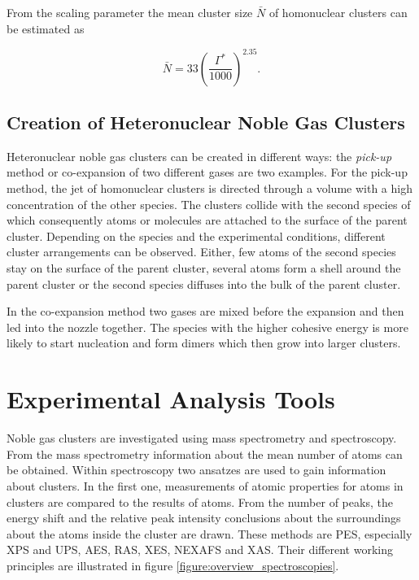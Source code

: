 From the scaling parameter the mean cluster size $\bar{N}$ 
of homonuclear clusters can be
estimated as

\begin{equation}
  \bar{N} = 33 \left( \frac{\Gamma^*}{1000} \right) ^{2.35} .
\end{equation}


\subsection{Creation of Heteronuclear Noble Gas Clusters}
Heteronuclear noble gas clusters can be created in different ways:
the \emph{pick-up} method or co-expansion of two different gases are two examples.
For the pick-up method, the jet of homonuclear clusters is directed through
a volume with a high concentration of the other species. The clusters
collide with the second species of which consequently atoms or molecules
are attached to the surface
of the parent cluster. Depending on the species
and the experimental conditions, different cluster arrangements can be observed.
Either, few atoms
of the second species stay on the surface of the parent cluster,
several atoms form a shell around the parent cluster or the second species
diffuses into the bulk of the parent cluster.

In the co-expansion method two gases are mixed before the expansion and
then led into the nozzle together. The species with the higher cohesive
energy is more likely to start nucleation and form dimers which
then grow into larger clusters.



\section{Experimental Analysis Tools}
Noble gas clusters are investigated using mass spectrometry and spectroscopy.
From the mass spectrometry information about the mean number of atoms
can be obtained. Within spectroscopy two ansatzes are used
to gain information about clusters. In the first one, measurements of
atomic properties for atoms in clusters are compared to the results of
atoms. From the number of peaks, the energy shift and the relative peak
intensity conclusions about the surroundings about the atoms inside
the cluster are drawn. These methods are \ac{PES}, especially \ac{XPS}
and \ac{UPS}, \ac{AES}, \ac{RAS}, \ac{XES}, \ac{NEXAFS} and \ac{XAS}.
Their different working principles are illustrated in figure
\ref{figure:overview_spectroscopies}.

